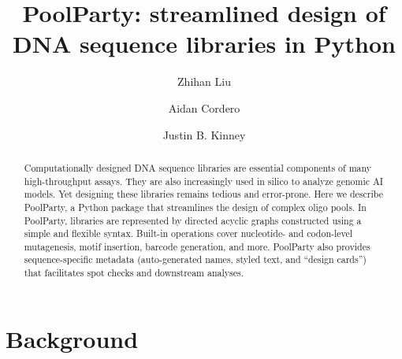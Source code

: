 \documentclass[twoside]{kinneylab_preprintstyle}
\begin{document}
\linenumbers
\raggedbottom
{}


\title{PoolParty: streamlined design of DNA sequence libraries in Python}

\author[1]{Zhihan Liu}
\author[1]{Aidan Cordero}
\author[1,\Letter]{Justin B. Kinney}


\begin{abstract}
Computationally designed DNA sequence libraries are essential components of many high-throughput assays. They are also increasingly used in silico to analyze genomic AI models. Yet designing these libraries remains tedious and error-prone. Here we describe PoolParty, a Python package that streamlines the design of complex oligo pools. In PoolParty, libraries are represented by directed acyclic graphs constructed using a simple and flexible syntax. Built-in operations cover nucleotide- and codon-level mutagenesis, motif insertion, barcode generation, and more. PoolParty also provides sequence-specific metadata (auto-generated names, styled text, and ``design cards'') that facilitates spot checks and downstream analyses.
\end{abstract}


\maketitle

\section*{Background}
\end{document}
